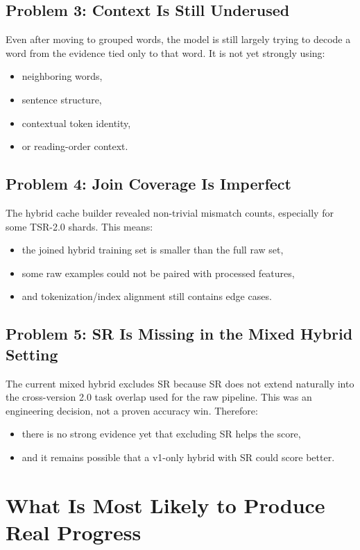\documentclass[11pt]{article}
\begin{document}
\subsection{Problem 3: Context Is Still Underused}

Even after moving to grouped words, the model is still largely trying to decode a word from the evidence tied only to that word. It is not yet strongly using:
\begin{itemize}
    \item neighboring words,
    \item sentence structure,
    \item contextual token identity,
    \item or reading-order context.
\end{itemize}

\subsection{Problem 4: Join Coverage Is Imperfect}

The hybrid cache builder revealed non-trivial mismatch counts, especially for some TSR-2.0 shards. This means:
\begin{itemize}
    \item the joined hybrid training set is smaller than the full raw set,
    \item some raw examples could not be paired with processed features,
    \item and tokenization/index alignment still contains edge cases.
\end{itemize}

\subsection{Problem 5: SR Is Missing in the Mixed Hybrid Setting}

The current mixed hybrid excludes SR because SR does not extend naturally into the cross-version 2.0 task overlap used for the raw pipeline. This was an engineering decision, not a proven accuracy win. Therefore:
\begin{itemize}
    \item there is no strong evidence yet that excluding SR helps the score,
    \item and it remains possible that a v1-only hybrid with SR could score better.
\end{itemize}

\section{What Is Most Likely to Produce Real Progress}
\end{document}
